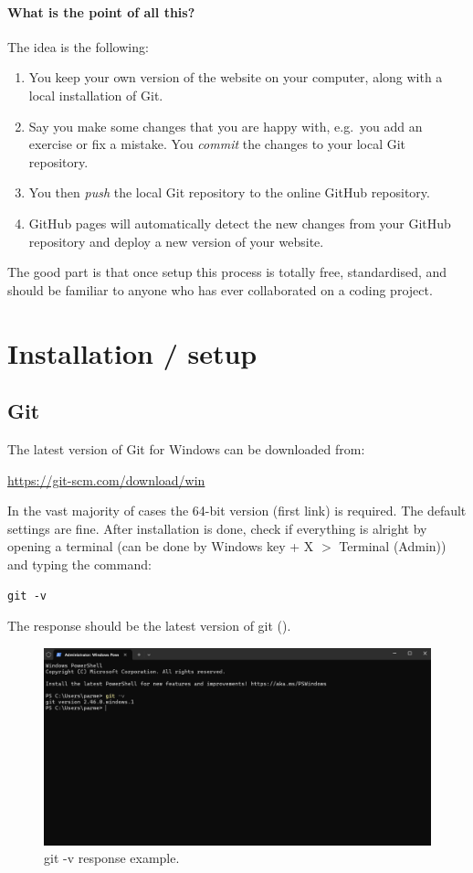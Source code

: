 \documentclass[a4paper,10pt]{article}
\begin{document}
\paragraph{What is the point of all this?} The idea is the following:
\begin{enumerate}
    \item You keep your own version of the website on your computer, along with a local installation of Git.
    \item Say you make some changes that you are happy with, e.g.\ you add an exercise or fix a mistake. You \emph{commit} the changes to your local Git repository.
    \item You then \emph{push} the local Git repository to the online GitHub repository.
    \item GitHub pages will automatically detect the new changes from your GitHub repository and deploy a new version of your website.
\end{enumerate}
The good part is that once setup this process is totally free, standardised, and should be familiar to anyone who has ever collaborated on a coding project. 

\section{Installation / setup}

\subsection{Git}

The latest version of Git for Windows can be downloaded from:

\url{https://git-scm.com/download/win}

In the vast majority of cases the 64-bit version (first link) is required. The default settings are fine. After installation is done, check if everything is alright by opening a terminal (can be done by
Windows key + X $>$ Terminal (Admin)) and typing the command: 

\texttt{git -v}

The response should be the latest version of git (). 

\begin{figure}[htbp]
    \includegraphics[width=\textwidth]{git-v.png}
    \caption{git -v response example.}
    \label{git-v}   
\end{figure}
\end{document}
